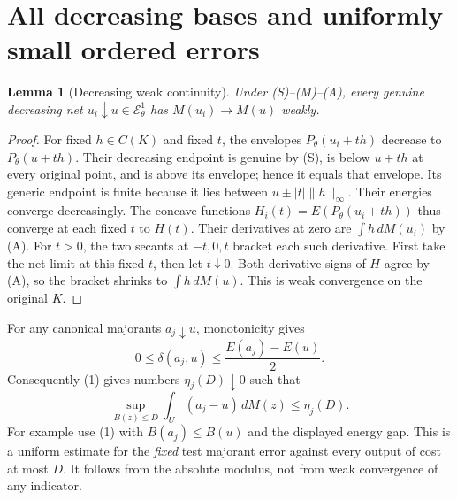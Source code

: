 \documentclass[11pt]{article}
\newtheorem{lemma}[theorem]{Lemma}
\newcommand{\EE}{\mathcal E^1_\theta}
\begin{document}
\section{All decreasing bases and uniformly small ordered errors}
\begin{lemma}[Decreasing weak continuity]\label{decreasing}
Under (S)--(M)--(A), every genuine decreasing net
$u_i\downarrow u\in\EE$ has $M(u_i)\to M(u)$ weakly.
\end{lemma}
\begin{proof}
For fixed $h\in C(K)$ and fixed $t$, the envelopes
$P_\theta(u_i+th)$ decrease to $P_\theta(u+th)$.
Their decreasing endpoint is genuine by (S), is below $u+th$
at every original point, and is above its envelope; hence it equals
that envelope. Its generic endpoint is finite because it lies
between $u\pm|t|\|h\|_\infty$.
Their energies converge decreasingly.
The concave functions $H_i(t)=E(P_\theta(u_i+th))$ thus converge
at each fixed $t$ to $H(t)$.
Their derivatives at zero are $\int h\,dM(u_i)$ by (A).
For $t>0$, the two secants at $-t,0,t$ bracket each such derivative.
First take the net limit at this fixed $t$, then let $t\downarrow0$.
Both derivative signs of $H$ agree by (A), so the bracket shrinks
to $\int h\,dM(u)$. This is weak convergence on the original $K$.
\end{proof}

For any canonical majorants $a_j\downarrow u$, monotonicity gives
\[
 0\leq\delta(a_j,u)\leq\frac{E(a_j)-E(u)}2.
\]
Consequently (1) gives numbers $\eta_j(D)\downarrow0$ such that
\[
 \sup_{B(z)\leq D}\int_U(a_j-u)\,dM(z)
       \leq\eta_j(D).                                  \tag{11}
\]
For example use (1) with $B(a_j)\leq B(u)$ and the displayed
energy gap. This is a uniform estimate for the \emph{fixed} test
majorant error against every output of cost at most $D$.
It follows from the absolute modulus, not from weak convergence
of any indicator.
\end{document}
